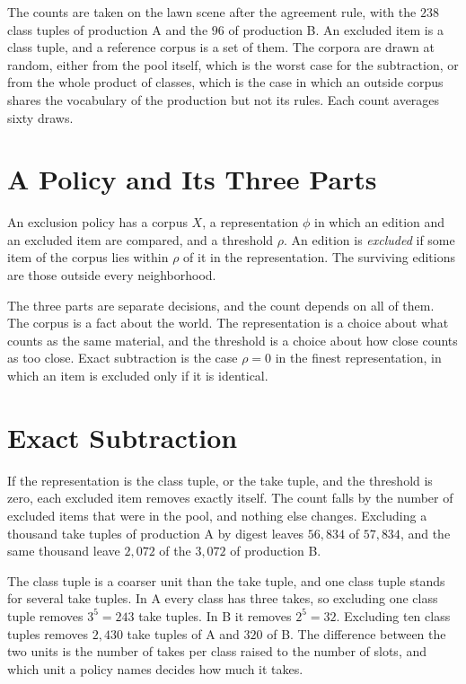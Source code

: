 \documentclass[11pt,twoside,openright]{book}
\theoremstyle{plain}
\theoremstyle{definition}
\theoremstyle{remark}
\begin{document}
The counts are taken on the lawn scene after the agreement rule, with the $238$ class tuples of production A and the $96$ of production B. An excluded item is a class tuple, and a reference corpus is a set of them. The corpora are drawn at random, either from the pool itself, which is the worst case for the subtraction, or from the whole product of classes, which is the case in which an outside corpus shares the vocabulary of the production but not its rules. Each count averages sixty draws.

\section{A Policy and Its Three Parts}\label{sec:policy15}

An exclusion policy has a corpus $X$, a representation $\phi$ in which an edition and an excluded item are compared, and a threshold $\rho$. An edition is \emph{excluded} if some item of the corpus lies within $\rho$ of it in the representation. The surviving editions are those outside every neighborhood.

The three parts are separate decisions, and the count depends on all of them. The corpus is a fact about the world. The representation is a choice about what counts as the same material, and the threshold is a choice about how close counts as too close. Exact subtraction is the case $\rho=0$ in the finest representation, in which an item is excluded only if it is identical.

\section{Exact Subtraction}\label{sec:exact15}

If the representation is the class tuple, or the take tuple, and the threshold is zero, each excluded item removes exactly itself. The count falls by the number of excluded items that were in the pool, and nothing else changes. Excluding a thousand take tuples of production A by digest leaves $56{,}834$ of $57{,}834$, and the same thousand leave $2{,}072$ of the $3{,}072$ of production B.

The class tuple is a coarser unit than the take tuple, and one class tuple stands for several take tuples. In A every class has three takes, so excluding one class tuple removes $3^5=243$ take tuples. In B it removes $2^5=32$. Excluding ten class tuples removes $2{,}430$ take tuples of A and $320$ of B. The difference between the two units is the number of takes per class raised to the number of slots, and which unit a policy names decides how much it takes.
\end{document}

